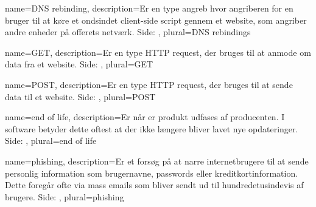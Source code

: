 {
    name={DNS rebinding},
    description={Er en type angreb hvor angriberen for en bruger til at køre et ondsindet client-side script gennem et website, som angriber andre enheder på offerets netværk.  Side: }, 
    plural={DNS rebindings}
}

{
    name={GET},
    description={Er en type HTTP request, der bruges til at anmode om data fra et website.  Side: }, 
    plural={GET}
}

{
    name={POST},
    description={Er en type HTTP request, der bruges til at sende data til et website.  Side: }, 
    plural={POST}
}

{
    name={end of life},
    description={Er når er produkt udfases af producenten. I software betyder dette oftest at der ikke længere bliver lavet nye opdateringer.  Side: }, 
    plural={end of life}
}

{
    name={phishing},
    description={Er et forsøg på at narre internetbrugere til at sende personlig information som brugernavne, passwords eller kreditkortinformation. Dette foregår ofte via mass emails som bliver sendt ud til hundredetusindevis af brugere.  Side: }, 
    plural={phishing}
}